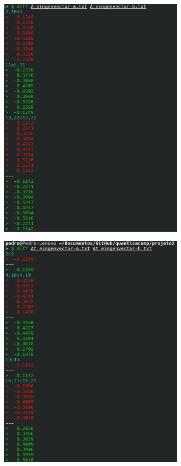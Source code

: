 \documentclass[12pt, a4paper]{article} %
\begin{document}
        \begin{figure}[H]
            \centering
            \includegraphics[width=0.8\textwidth]{../images/diffA10.png}
        \end{figure}
        \begin{figure}[H]
            \centering
            \includegraphics[width=0.8\textwidth]{../images/diffAt10.png}
        \end{figure}
\end{document}
